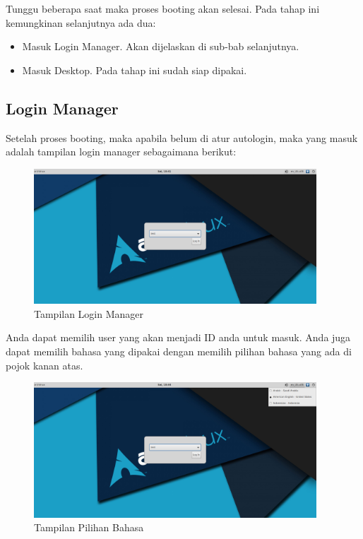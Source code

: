 \documentclass[12pt,]{article}
\begin{document}
	Tunggu beberapa saat maka proses booting akan selesai. Pada tahap ini kemungkinan selanjutnya ada dua:

	\begin{itemize}
		\item Masuk Login Manager. Akan dijelaskan di sub-bab selanjutnya.
		\item Masuk Desktop. Pada tahap ini sudah siap dipakai.
	\end{itemize}

	\newpage

	\subsection{Login Manager}

	Setelah proses booting, maka apabila belum di atur autologin, maka yang masuk adalah tampilan login manager sebagaimana berikut:

	\begin{figure}[!ht]
		\centering
		\includegraphics[width=300pt]{png/login}
		\caption{Tampilan Login Manager}
	\end{figure}

	Anda dapat memilih user yang akan menjadi ID anda untuk masuk.
	Anda juga dapat memilih bahasa yang dipakai dengan memilih pilihan bahasa yang ada di pojok kanan atas.

	\begin{figure}[!ht]
		\centering
		\includegraphics[width=300pt]{png/login_lang}
		\caption{Tampilan Pilihan Bahasa}
	\end{figure}
\end{document}

